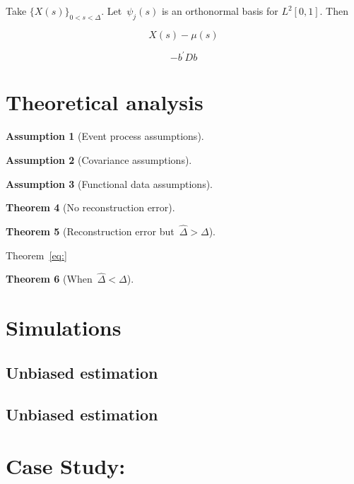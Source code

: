 \documentclass[11pt]{amsart}
\newtheorem{thm}{Theorem}[section]
\newtheorem{assumption}[thm]{Assumption}
\begin{document}
Take $\{ X (s) \}_{0 < s < \Delta}$. Let~$\psi_{j} (s)$ is an
orthonormal basis for $L^2 [ 0,1 ]$.  Then

\[
X(s) - \mu(s) 
\]

\[
- b^\prime D b
\]


\section{Theoretical analysis}

\begin{assumption}[Event process assumptions]

\end{assumption}

\begin{assumption}[Covariance assumptions]

\end{assumption}

\begin{assumption}[Functional data assumptions]

\end{assumption}

\begin{thm}[No reconstruction error]

\end{thm}

\begin{thm}[Reconstruction error but~$\hat \Delta > \Delta$]
\label{eq:biaseddown}
\end{thm}

Theorem~\ref{eq:}



\begin{thm}[When~$\hat \Delta < \Delta$] 

\end{thm}



\section{Simulations}

\subsection{Unbiased estimation}

\subsection{Unbiased estimation}

\section{Case Study: }



\end{document}
